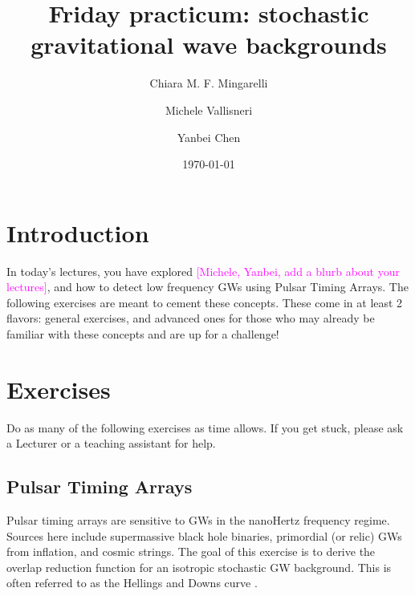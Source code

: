\documentclass[article, onecolumn, ,nofootinbib,nopreprintnumbers]{revtex4}
\newcommand{\cm}{\textcolor{magenta}}
\begin{document}
\title{Friday practicum: stochastic gravitational wave backgrounds}
\author{Chiara M. F. Mingarelli}
\author{Michele Vallisneri}
\author{Yanbei Chen}

\date\today
\maketitle

\section{Introduction}
In today's lectures, you have explored \cm{[Michele, Yanbei, add a blurb about your lectures]}, and how to detect low frequency GWs using Pulsar Timing Arrays. The following exercises are meant to cement these concepts. These come in at least 2 flavors: general exercises, and advanced ones for those who may already be familiar with these concepts and are up for a challenge! 

\section{Exercises}
Do as many of the following exercises as time allows. If you get stuck, please ask a Lecturer or a teaching assistant for help.

\subsection{Pulsar Timing Arrays}
Pulsar timing arrays are sensitive to GWs in the nanoHertz frequency regime. Sources here include supermassive black hole binaries, primordial (or relic) GWs from inflation, and cosmic strings. The goal of this exercise is to derive the overlap reduction function for an isotropic stochastic GW background. This is often referred to as the Hellings and Downs curve \cite{HellingsDowns:1983}.
\end{document}

